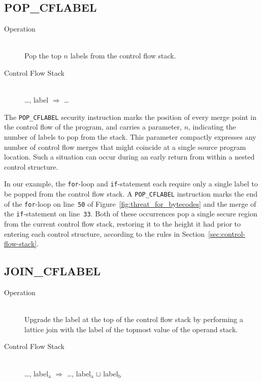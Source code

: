 \documentclass[preprint]{sigplanconf}
\newcommand{\subscript}[1]{\ensuremath{_{\textrm{#1}}}}
\begin{document}
\subsection{POP\_CFLABEL}

\begin{description}
\item[Operation] \hfill \\
 Pop the top $n$ labels from the control flow stack.
\item[Control Flow Stack] \hfill \\
 \ldots, label $\Rightarrow$ \ldots
\end{description}

The \texttt{POP\_CFLABEL} security instruction marks the position of every merge point in the control flow of the program, and carries a parameter, $n$, indicating the number of labels to pop from the stack.
This parameter compactly expresses any number of control flow merges that might coincide at a single source program location.
Such a situation can occur during an early return from within a nested control structure.

In our example, the \texttt{for}-loop and \texttt{if}-statement each require only a single label to be popped from the control flow stack.
A \texttt{POP\_CFLABEL} instruction marks the end of the \texttt{for}-loop on line~\texttt{50} of Figure~\ref{fig:threat_for_bytecodes} and the merge of the \texttt{if}-statement on line~\texttt{33}.
Both of these occurrences pop a single secure region from the current control flow stack, restoring it to the height it had prior to entering each control structure, according to the rules in Section~\ref{sec:control-flow-stack}.

\subsection{JOIN\_CFLABEL}
\label{sec:join-cflabel}

\begin{description}
\item[Operation] \hfill \\
 Upgrade the label at the top of the control flow stack by performing a lattice join with the label of the topmost value of the operand stack.
\item[Control Flow Stack] \hfill \\
 \ldots, label\subscript{a} $\Rightarrow$ \ldots, label\subscript{a} $\sqcup$ label\subscript{b}
\end{description}
\end{document}
